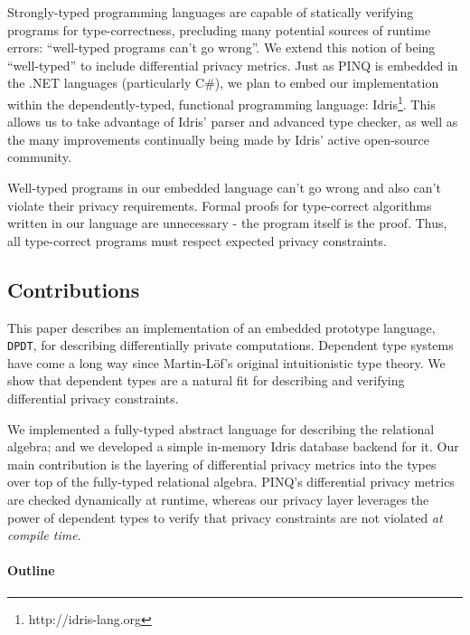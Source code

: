\documentclass[12pt]{article}
\begin{document}
Strongly-typed programming languages are capable of statically verifying programs for type-correctness, precluding many potential sources of runtime errors: ``well-typed programs can't go wrong''.
We extend this notion of being ``well-typed'' to include differential privacy metrics.
Just as PINQ is embedded in the .NET languages (particularly C\#), we plan to embed our implementation within the dependently-typed, functional programming language: Idris\footnote{http://idris-lang.org}.
This allows us to take advantage of Idris' parser and advanced type checker, as well as the many improvements continually being made by Idris' active open-source community.

Well-typed programs in our embedded language can't go wrong and also can't violate their privacy requirements.
Formal proofs for type-correct algorithms written in our language are unnecessary - the program itself is the proof.
Thus, all type-correct programs must respect expected privacy constraints.

\subsection{Contributions}

This paper describes an implementation of an embedded prototype language, \texttt{DPDT}, for describing differentially private computations.
Dependent type systems have come a long way since Martin-L\"of's original intuitionistic type theory.
We show that dependent types are a natural fit for describing and verifying differential privacy constraints.

We implemented a fully-typed abstract language for describing the relational algebra; and we developed a simple in-memory Idris database backend for it.
Our main contribution is the layering of differential privacy metrics into the types over top of the fully-typed relational algebra.
PINQ's differential privacy metrics are checked dynamically at runtime, whereas our privacy layer leverages the power of dependent types to verify that privacy constraints are not violated \textit{at compile time}.


\paragraph{Outline}
\end{document}
